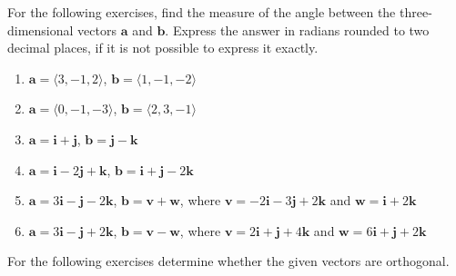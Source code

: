 \documentclass{exercises}
\begin{document}
For the following exercises, find the measure of the angle between the three-dimensional vectors $\mathbf{a}$ and $\mathbf{b}$. Express the answer in radians rounded to two decimal places, if it is not possible to express it exactly.

\begin{enumerate}[resume]
\item $\mathbf{a}=\langle3,-1,2\rangle$, $\mathbf{b}=\langle1,-1,-2\rangle$
\item $\mathbf{a}=\langle0,-1,-3\rangle$, $\mathbf{b}=\langle2,3,-1\rangle$
\item $\mathbf{a}=\mathbf{i}+\mathbf{j}$, $\mathbf{b}=\mathbf{j}-\mathbf{k}$
\item $\mathbf{a}=\mathbf{i}-2\mathbf{j}+\mathbf{k}$, $\mathbf{b}=\mathbf{i}+\mathbf{j}-2\mathbf{k}$
\item \techrequired $\mathbf{a}=3\mathbf{i}-\mathbf{j}-2\mathbf{k}$, $\mathbf{b}=\mathbf{v}+\mathbf{w}$, where $\mathbf{v}=-2\mathbf{i}-3\mathbf{j}+2\mathbf{k}$ and $\mathbf{w}=\mathbf{i}+2\mathbf{k}$
\item \techrequired $\mathbf{a}=3\mathbf{i}-\mathbf{j}+2\mathbf{k}$, $\mathbf{b}=\mathbf{v}-\mathbf{w}$, where $\mathbf{v}=2\mathbf{i}+\mathbf{j}+4\mathbf{k}$ and $\mathbf{w}=6\mathbf{i}+\mathbf{j}+2\mathbf{k}$
\end{enumerate}

For the following exercises determine whether the given vectors are orthogonal.
\end{document}
